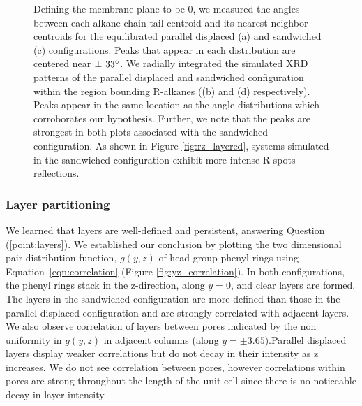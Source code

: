\documentclass[journal=jpcbfk,manusciprt=article]{achemso}
\begin{document}
\begin{figure}[!htb]
{	  Defining the membrane plane to be 0\degree, we
	  measured the angles between each alkane chain tail centroid and its nearest
	  neighbor centroids for the equilibrated parallel displaced (a) and sandwiched
	  (c) configurations. Peaks that appear in each distribution are centered near
	  $\pm~33\degree$. We radially integrated the simulated XRD patterns of the
	  parallel displaced and sandwiched configuration within the region bounding
	  R-alkanes ((b) and (d) respectively).  Peaks appear in the same location as the
	  angle distributions which corroborates our hypothesis. Further, we note that
	  the peaks are strongest in both plots associated with the sandwiched
	  configuration. As shown in Figure \ref{fig:rz_layered}, systems simulated in
	  the sandwiched configuration exhibit more intense R-spots
	  reflections.}~\label{fig:tail_packing}
  \end{figure}

  \subsubsection{Layer partitioning}

  We learned that layers are well-defined and persistent, answering Question
  (\ref{point:layers}). We established our conclusion by plotting the two
  dimensional pair distribution function, $g(y,z)$ of head group phenyl rings
  using Equation~\ref{eqn:correlation} (Figure \ref{fig:yz_correlation}). In both
  configurations, the phenyl rings stack in the z-direction, along $y=0$, and
  clear layers are formed. The layers in the sandwiched configuration are more
  defined than those in the parallel displaced configuration and are strongly
  correlated with adjacent layers. We also observe correlation of layers between
  pores indicated by the non uniformity in $g(y,z)$ in adjacent columns (along $y
  = \pm 3.65$).Parallel displaced layers display weaker correlations but do not
  decay in their intensity as z increases. We do not see correlation between
  pores, however correlations within pores are strong throughout the length of
  the unit cell since there is no noticeable decay in layer intensity. 
\end{document}
